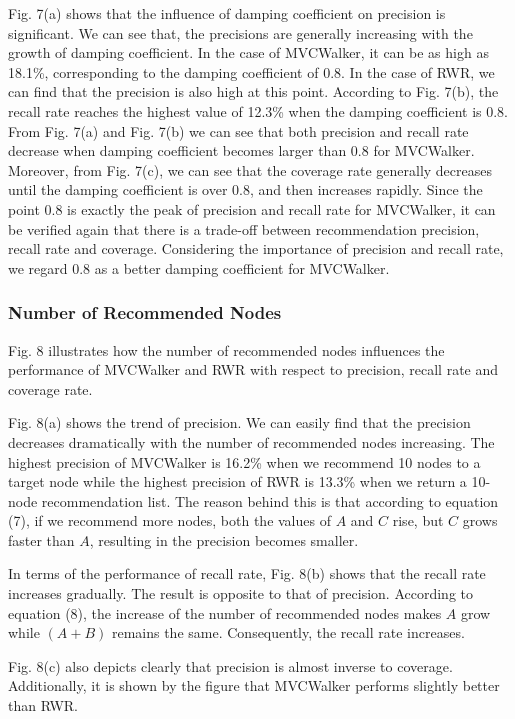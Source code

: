 \documentclass[10pt,journal,compsoc]{IEEEtran}
\begin{document}
Fig. 7(a) shows that the influence of damping coefficient on precision is significant. We can see that, the precisions are generally increasing with the growth of damping coefficient. In the case of MVCWalker, it can be as high as 18.1\%, corresponding to the damping coefficient of 0.8. In the case of RWR, we can find that the precision is also high at this point. According to Fig. 7(b), the recall rate reaches the highest value of 12.3\% when the damping coefficient is 0.8. From Fig. 7(a) and Fig. 7(b) we can see that both precision and recall rate decrease when damping coefficient becomes larger than 0.8 for MVCWalker. Moreover, from Fig. 7(c), we can see that the coverage rate generally decreases until the damping coefficient is over 0.8, and then increases rapidly. Since the point 0.8 is exactly the peak of precision and recall rate for MVCWalker, it can be verified again that there is a trade-off between recommendation precision, recall rate and coverage. Considering the importance of precision and recall rate, we regard 0.8 as a better damping coefficient for MVCWalker.

\subsubsection{Number of Recommended Nodes}

Fig. 8 illustrates how the number of recommended nodes influences the performance of MVCWalker and RWR with respect to precision, recall rate and coverage rate.

Fig. 8(a) shows the trend of precision. We can easily find that the precision decreases dramatically with the number of recommended nodes increasing. The highest precision of MVCWalker is 16.2\% when we recommend 10 nodes to a target node while the highest precision of RWR is 13.3\% when we return a 10-node recommendation list. The reason behind this is that according to equation (7), if we recommend more nodes, both the values of $A$ and $C$ rise, but $C$ grows faster than $A$, resulting in the precision becomes smaller.

In terms of the performance of recall rate, Fig. 8(b) shows that the recall rate increases gradually. The result is opposite to that of precision. According to equation (8), the increase of the number of recommended nodes makes $A$ grow while $(A+B)$ remains the same. Consequently, the recall rate increases.

Fig. 8(c) also depicts clearly that precision is almost inverse to coverage. Additionally, it is shown by the figure that MVCWalker performs slightly better than RWR.
\end{document}
